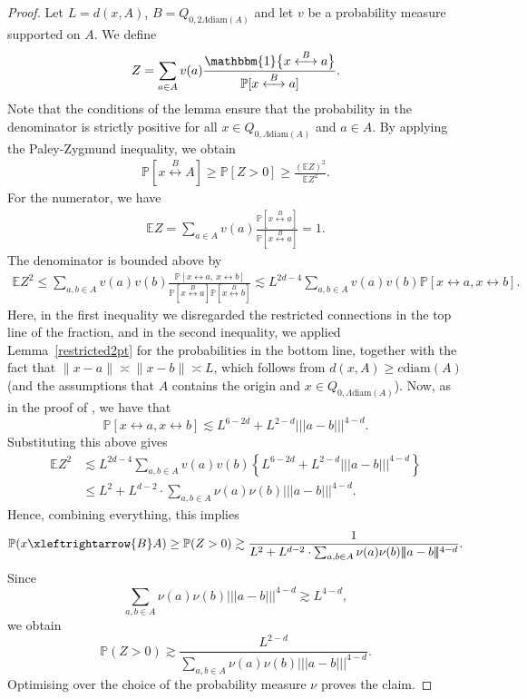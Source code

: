 \documentclass[11pt]{article}
\theoremstyle{definition}
\theoremstyle{remark}
\newcommand{\E}{\mathbb{E}}
\newcommand{\bP}{\mathbb{P}}
\numberwithin{equation}{section}
\theoremstyle{plain}
\theoremstyle{definition}
\theoremstyle{remark}
\theoremstyle{plain}
\newcommand{\ind}[1]{\mathbbm{1}\big\{#1\big\}}
\newcommand{\tnorm}[1]{\vert\!\vert\!\vert #1 \vert\!\vert\!\vert}
\begin{document}
\begin{proof} Let $L=d(x,A)$, $B=Q_{0,2\Lambda\mathrm{diam}(A)}$ and let $v$ be a probability measure supported on $A$. We define
\begin{align*}
    Z=\sum_{a \in A}v(a)\frac{\ind{x\overset{B}{\longleftrightarrow }a}}{\bP[x \overset{B}{\longleftrightarrow } a]}.
\end{align*}
Note that the conditions of the lemma ensure that the probability in the denominator is strictly positive for all $x\in Q_{0,\Lambda \mathrm{diam}(A)}$ and $a\in A$. By applying the Paley-Zygmund inequality, we obtain
\begin{align*}
    \bP[x \overset{B}{\longleftrightarrow } A]\ge \bP[Z>0]\ge \frac{(\E Z)^2}{\E Z^2}.
\end{align*}
For the numerator, we have
\begin{align*}
    \E Z=\sum_{a \in A}v(a)\frac{\bP[x \overset{B}{\longleftrightarrow } a]}{\bP[x \overset{B}{\longleftrightarrow } a]}=1.
\end{align*}
The denominator is bounded above by
\begin{align*}
\E Z^2\le \sum_{a,b\in A}v(a)v(b)\frac{\bP[x  \leftrightarrow a,\: x \leftrightarrow  b]}{\bP[x \overset{B}{\longleftrightarrow } a]\bP[x \overset{B}{\longleftrightarrow } b]}\lesssim L^{2d-4}\sum_{a,b\in A}v(a)v(b)\bP[x  \leftrightarrow a, x \leftrightarrow  b].
\end{align*}
Here, in the first inequality we disregarded the restricted connections in the top line of the fraction, and in the second inequality, we applied Lemma~\ref{restricted2pt} for the probabilities in the bottom line,  together with the fact that $\lVert x-a \rVert\asymp \lVert x-b\rVert \asymp L$, which follows from $d(x,A)\ge  c\mathrm{diam}(A)$ (and the assumptions that $A$ contains the origin and $x\in Q_{0,\Lambda \mathrm{diam}(A)}$). Now, as in the proof of \cite[Lemma 6.3]{ASS}, we have that
\[\bP[x  \leftrightarrow a, x \leftrightarrow  b]\lesssim L^{6-2d}+L^{2-d}\tnorm{a-b}^{4-d}.\]
Substituting this above gives
\begin{align*}
    \E Z^2&\lesssim L^{2d-4}\sum_{a,b\in A}v(a)v(b)\left\{L^{6-2d}+L^{2-d}\tnorm{a-b}^{4-d}\right\}\\
    &\le L^2 + L^{d-2} \cdot \sum_{a,b \in A} \nu(a)\nu(b)\tnorm{a-b}^{4-d}.
\end{align*}
Hence, combining everything, this implies
\[\bP(x  \xleftrightarrow{B}A) \ge  \bP(Z > 0) \gtrsim
\frac{1}{L^2 + L^{d-2} \cdot \sum_{a,b \in A} \nu(a)\nu(b)\tnorm{a-b}^{4-d}}.
\]
Since
\[\sum_{a,b \in A} \nu(a)\nu(b)\tnorm{a-b}^{4-d} \gtrsim L^{4-d},\]
we obtain
\[
\bP(Z > 0) \gtrsim \frac{L^{2-d}}{\sum_{a,b \in A} \nu(a)\nu(b)\tnorm{a-b}^{4-d}}.
\]
Optimising over the choice of the probability measure $\nu$ proves the claim.
\end{proof}
\end{document}
